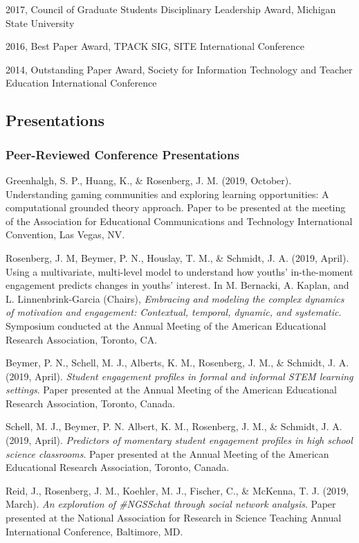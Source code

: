 \documentclass[14,]{article}
\begin{document}
2017, Council of Graduate Students Disciplinary Leadership Award,
Michigan State University

2016, Best Paper Award, TPACK SIG, SITE International Conference

2014, Outstanding Paper Award, Society for Information Technology and
Teacher Education International Conference

\subsection{Presentations}\label{presentations}

\subsubsection{Peer-Reviewed Conference
Presentations}\label{peer-reviewed-conference-presentations}

Greenhalgh, S. P., Huang, K., \& Rosenberg, J. M. (2019, October).
Understanding gaming communities and exploring learning opportunities: A
computational grounded theory approach. Paper to be presented at the
meeting of the Association for Educational Communications and Technology
International Convention, Las Vegas, NV.

Rosenberg, J. M, Beymer, P. N., Houslay, T. M., \& Schmidt, J. A. (2019,
April). Using a multivariate, multi-level model to understand how
youths' in-the-moment engagement predicts changes in youths' interest.
In M. Bernacki, A. Kaplan, and L. Linnenbrink-Garcia (Chairs),
\emph{Embracing and modeling the complex dynamics of motivation and
engagement: Contextual, temporal, dynamic, and systematic}. Symposium
conducted at the Annual Meeting of the American Educational Research
Association, Toronto, CA.

Beymer, P. N., Schell, M. J., Alberts, K. M., Rosenberg, J. M., \&
Schmidt, J. A. (2019, April). \emph{Student engagement profiles in
formal and informal STEM learning settings}. Paper presented at the
Annual Meeting of the American Educational Research Association,
Toronto, Canada.

Schell, M. J., Beymer, P. N. Albert, K. M., Rosenberg, J. M., \&
Schmidt, J. A. (2019, April). \emph{Predictors of momentary student
engagement profiles in high school science classrooms}. Paper presented
at the Annual Meeting of the American Educational Research Association,
Toronto, Canada.

Reid, J., Rosenberg, J. M., Koehler, M. J., Fischer, C., \& McKenna, T.
J. (2019, March). \emph{An exploration of \#NGSSchat through social
network analysis}. Paper presented at the National Association for
Research in Science Teaching Annual International Conference, Baltimore,
MD.
\end{document}
